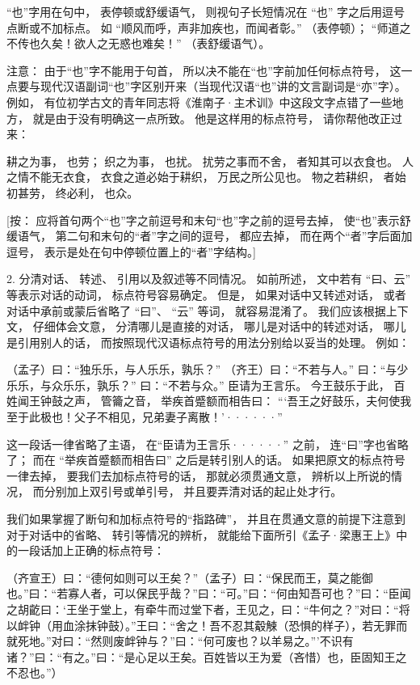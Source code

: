 “也”字用在句中，
表停顿或舒缓语气，
则视句子长短情况在
“也”
字之后用逗号点断或不加标点。
如
“顺风而呼，声非加疾也，而闻者彰。”
（表停顿）；
“师道之不传也久矣！欲人之无惑也难矣！”
（表舒缓语气）。

注意：
由于“也”字不能用于句首，
所以决不能在“也”字前加任何标点符号，
这一点要与现代汉语副词“也”字区别开来（当现代汉语“也”讲的文言副词是“亦”字）。
例如，
有位初学古文的青年同志将《淮南子·主术训》中这段文字点错了一些地方，
就是由于没有明确这一点所致。
他是这样用的标点符号，
请你帮他改正过来：

耕之为事，
也劳；
织之为事，
也扰。
扰劳之事而不舍，
者知其可以衣食也。
人之情不能无衣食，
衣食之道必始于耕织，
万民之所公见也。
物之若耕织，
者始初甚劳，
终必利，
也众。

[按：
应将首句两个“也”字之前逗号和末句“也”字之前的逗号去掉，
使“也”表示舒缓语气，
第二句和末句的“者”字之间的逗号，
都应去掉，
而在两个“者”字后面加逗号，
表示是处在句中停顿位置上的“者”字结构。]

2. 分清对话、
转述、
引用以及叙述等不同情况。
如前所述，
文中若有
“曰、云”
等表示对话的动词，
标点符号容易确定。
但是，
如果对话中又转述对话，
或者对话中承前或蒙后省略了
“曰”、
“云”
等词，
就容易混淆了。
我们应该根据上下文，
仔细体会文意，
分清哪儿是直接的对话，
哪儿是对话中的转述对话，
哪儿是引用别人的话，
而按照现代汉语标点符号的用法分别给以妥当的处理。
例如：

（孟子）曰：“独乐乐，与人乐乐，孰乐？”
（齐王）曰：“不若与人。”
曰：“与少乐乐，与众乐乐，孰乐？”
曰：“不若与众。”
臣请为王言乐。
今王鼓乐于此，
百姓闻王钟鼓之声，
管籥之音，
举疾首蹙额而相告曰：
“‘吾王之好鼓乐，夫何使我至于此极也！父子不相见，兄弟妻子离散！’······”

这一段话一律省略了主语，
在“臣请为王言乐······”
之前，
连“曰”字也省略了；
而在
“举疾首蹙额而相告曰”
之后是转引别人的话。
如果把原文的标点符号一律去掉，
要我们去加标点符号的话，
那就必须贯通文意，
辨析以上所说的情况，
而分别加上双引号或单引号，
并且要弄清对话的起止处才行。

我们如果掌握了断句和加标点符号的“指路碑”，
并且在贯通文意的前提下注意到对于对话中的省略、
转引等情况的辨析，
就能给下面所引《孟子·梁惠王上》中的一段话加上正确的标点符号：

（齐宣王）曰：“德何如则可以王矣？”（孟子）曰：“保民而王，莫之能御也。”曰：“若寡人者，可以保民乎哉？”曰：“可。”曰：“何由知吾可也？”曰：“臣闻之胡齕曰：‘王坐于堂上，有牵牛而过堂下者，王见之，曰：“牛何之？”对曰：“将以衅钟（用血涂抹钟鼓）。”王曰：“舍之！吾不忍其觳觫（恐惧的样子），若无罪而就死地。”对曰：“然则废衅钟与？”曰：“何可废也？以羊易之。”’不识有诸？”曰：“有之。”曰：“是心足以王矣。百姓皆以王为爱（吝惜）也，臣固知王之不忍也。”）


